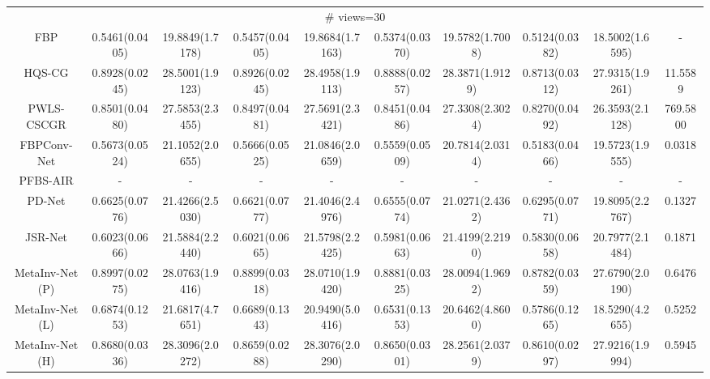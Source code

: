 \documentclass[journal,twoside]{IEEEtran}
\begin{document}
\begin{table*}[ht]
\begin{tabular}{|c|c|c|c|c|c|c|c|c|c|}
  
 \multicolumn{10}{|c|}{\cellcolor{gbygreen}\# views=30} \\
  \cline{1-10}
FBP 
&0.5461(0.0405) &19.8849(1.7178) 
&0.5457(0.0405) &19.8684(1.7163) 
&0.5374(0.0370) &19.5782(1.7008) 
&0.5124(0.0382) &18.5002(1.6595) &- \\
  \cline{1-10}
HQS-CG 
&\cellcolor{gbyblue}0.8928(0.0245) &\cellcolor{gbypink}28.5001(1.9123) 
&\cellcolor{gbypink}0.8926(0.0245) &\cellcolor{gbypink}28.4958(1.9113) 
&\cellcolor{gbypink}0.8888(0.0257) &\cellcolor{gbypink}28.3871(1.9129) \
&\cellcolor{gbyblue}0.8713(0.0312) &\cellcolor{gbypink}27.9315(1.9261) &11.5589 \\
  \cline{1-10}
PWLS-CSCGR
&0.8501(0.0480) &27.5853(2.3455) 
&0.8497(0.0481) &27.5691(2.3421)
&0.8451(0.0486) &27.3308(2.3024) 
&0.8270(0.0492) &26.3593(2.1128) &769.5800\\
    \cline{1-10}
FBPConv-Net 
&0.5673(0.0524) &21.1052(2.0655) 
&0.5666(0.0525) &21.0846(2.0659) 
&0.5559(0.0509) &20.7814(2.0314) 
&0.5183(0.0466) &19.5723(1.9555) &0.0318 \\
    \cline{1-10}
PFBS-AIR 
&- &- &- &- &- &- &- &- &-\\
    \cline{1-10}
PD-Net 
&0.6625(0.0776) &21.4266(2.5030) 
&0.6621(0.0777) &21.4046(2.4976) 
&0.6555(0.0774) &21.0271(2.4362) 
&0.6295(0.0771) &19.8095(2.2767) &0.1327\\
  \cline{1-10}
JSR-Net 
&0.6023(0.0666) &21.5884(2.2440) 
&0.6021(0.0665) &21.5798(2.2425) 
&0.5981(0.0663) &21.4199(2.2190) 
&0.5830(0.0658) &20.7977(2.1484) &0.1871\\
  \cline{1-10}
MetaInv-Net (P) 
  &\cellcolor{gbypink}0.8997(0.0275) &28.0763(1.9416) 
  &\cellcolor{gbyblue}0.8899(0.0318) &28.0710(1.9420)
  &\cellcolor{gbyblue}0.8881(0.0325) &28.0094(1.9692) 
  &\cellcolor{gbypink}0.8782(0.0359) &27.6790(2.0190) &0.6476\\
    \cline{1-10}
MetaInv-Net (L)
&0.6874(0.1253) &21.6817(4.7651) 
&0.6689(0.1343) &20.9490(5.0416) 
&0.6531(0.1353) &20.6462(4.8600) 
&0.5786(0.1265) &18.5290(4.2655) &0.5252 \\
  \cline{1-10}
MetaInv-Net (H) 
&0.8680(0.0336) &\cellcolor{gbyblue}28.3096(2.0272) 
&0.8659(0.0288) &\cellcolor{gbyblue}28.3076(2.0290) 
&0.8650(0.0301) &\cellcolor{gbyblue}28.2561(2.0379) 
&0.8610(0.0297) &\cellcolor{gbyblue}27.9216(1.9994) &0.5945\\
  \cline{1-9}
  

\end{tabular}
\end{table*}
\end{document}
